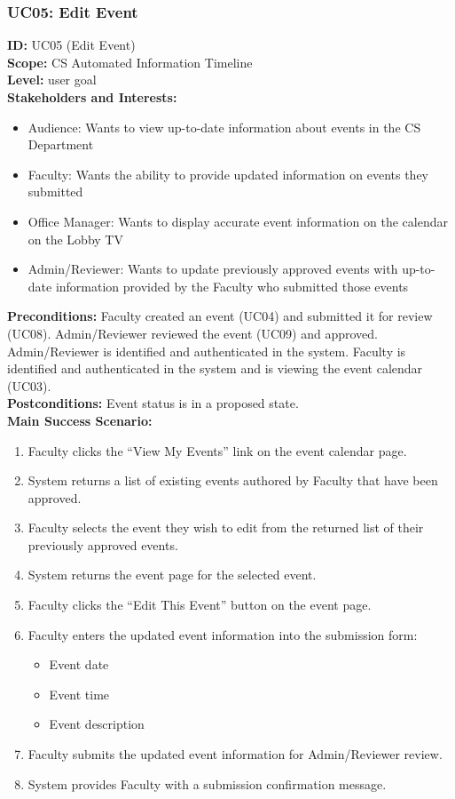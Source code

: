 \documentclass{article}
\begin{document}
\subsubsection{UC05: Edit Event}
\textbf{ID:} UC05 (Edit Event) \\
\textbf{Scope:} CS Automated Information Timeline \\
\textbf{Level:} user goal \\
\textbf{Stakeholders and Interests:}
\begin{itemize}
    \item Audience: Wants to view up-to-date information about events in the CS Department
    \item Faculty: Wants the ability to provide updated information on events they submitted
    \item Office Manager: Wants to display accurate event information on the calendar on the Lobby TV
    \item Admin/Reviewer: Wants to update previously approved events with up-to-date information provided by the Faculty who submitted those events
\end{itemize}
\textbf{Preconditions:} Faculty created an event (UC04) and submitted it for review (UC08). Admin/Reviewer reviewed the event (UC09) and approved. Admin/Reviewer is identified and authenticated in the system. Faculty is identified and authenticated in the system and is viewing the event calendar (UC03). \\
\textbf{Postconditions:} Event status is in a proposed state. \\
\textbf{Main Success Scenario:}
\begin{enumerate}
    \item Faculty clicks the ``View My Events'' link on the event calendar page.
    \item System returns a list of existing events authored by Faculty that have been approved.
    \item Faculty selects the event they wish to edit from the returned list of their previously approved events.
    \item System returns the event page for the selected event.
    \item Faculty clicks the “Edit This Event” button on the event page.
    \item Faculty enters the updated event information into the submission form:
    \begin{itemize}
        \item Event date
        \item Event time
        \item Event description
    \end{itemize}
    \item Faculty submits the updated event information for Admin/Reviewer review.
    \item System provides Faculty with a submission confirmation message.
\end{enumerate}
\end{document}
